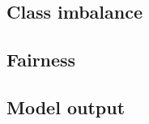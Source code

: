 \documentclass{article}
\begin{document}









\subsection{Class imbalance}\label{sec:class_imbalance}

\subsection{Fairness}\label{sec:fairness}

\subsection{Model output}\label{sec:model_output}
\end{document}
